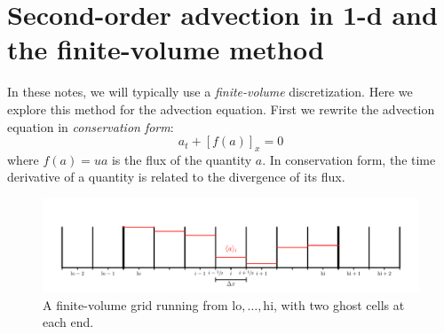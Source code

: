 \section{Second-order advection in 1-d and the finite-volume method}

In these notes, we will typically use a {\em finite-volume} discretization.  Here we 
explore this method for the 
advection equation.  First we rewrite the advection equation in {\em
  conservation form}:
\begin{equation}
a_t + \left[f(a)\right]_x = 0
\label{eq:advect-cons}
\end{equation}
where $f(a) = ua$ is the flux of the quantity $a$.  In conservation form,
the time derivative of a quantity is related to the divergence of 
its flux.

\begin{figure}[t]
\centering
\includegraphics[width=\linewidth]{fv_ghost}
\caption[A finite-volume grid with valid cells
  labelled]{\label{fig:fvghost} A finite-volume grid running from
  $\mathrm{lo}, \ldots, \mathrm{hi}$, with two ghost cells at each
  end.}
\end{figure}

